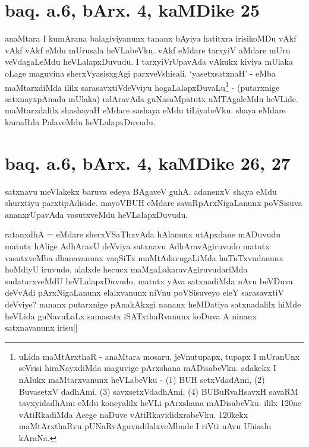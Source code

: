 \section*{baq. a.6, bArx. 4, kaMDike 25}

\stext

\begin{artha}
anaMtara I kumArana balagiviyanunx tananx bAyiya hatitxra irisikoMDu 
vAkf vAkf vAkf eMdu mUrusala heVLabeVku. vAkf eMdare tarxyiV aMdare 
mUru veVdagaLeMdu heVLalapxDuvudu. I tarxyiVrUpavAda vAkukx kiviya 
mUlaka oLage maguvina sherxVyasisxgAgi parxveVshisali. `yasetxsatxnaH' 
- eMba maMtarxdiMda ililx sarasavxtiVdeVviyu 
hogaLalapxDuvaLu\footnote[1]{uLida maMtArxthaR - anaMtara mosaru, 
jeVnutupapx, tupapx I mUranUnx seVrisi hiraNayxdiMda maguvige 
pArxshana mADisabeVku. adakekx I nAlukx maMtarxvanunx heVLabeVku - (1) 
BUH setxVdadAmi, (2) BuvasetxV dadhAmi, (3) savxsetxVdadhAmi, (4) 
BUBuRvaHsavxH savaRM tavxyidadhAmi eMdu koneyalilx heVLi pArxshana 
mADisabeVku. ililx 120ne vAtiRkadiMda Acege naDuve 
vAtiRkavididxrabeVku. 120kekx maMtArxthaRvu pUNaRvAguvudilalxveMbude I 
riVti nAvu Uhisalu kAraNa.} - (putarxnige satxnayxpAnada mUlaka) 
udAravAda guNasaMpatutx uMTAgaleMdu heVLide. maMtarxdalilx shashayaH 
eMdare sashaya eMdu tiLiyabeVku. shaya eMdare kamaRda PalaveMdu 
heVLalapxDuvudu.
\end{artha}

\section*{baq. a.6, bArx. 4, kaMDike 26, 27}

\stext

\stext

\begin{artha}
satxnavu meVlakekx baruva edeya BAgaveV guhA. adanenxV shaya eMdu 
shurxtiyu parxtipAdiside. mayoVBUH eMdare savaRpArxNigaLanunx 
poVSisuva ananxrUpavAda vasutxveMdu heVLalapxDuvudu.
\end{artha}


\begin{artha}
ratanxdhA = eMdare sherxVSaThxvAda hAlanunx utApxdane mADuvudu matutx 
hAlige AdhAravU deVviya satxnavu AdhAravAgiruvudo matutx vasutxveMba 
dhanavanunx vaqSiTx muMtAdavugaLiMda huTuTxvudanunx hoMdiyU iruvudo, 
alalxde hecucx maMgaLakaravAgiruvudariMda sudatarxveMdU 
heVLalapxDuvudo, matutx yAva satxnadiMda nAvu beVDuva deVvAdi 
pArxNigaLanunx elalxvanunx niVnu poVSisuveyo eleY sarasavxtiV deVviye? 
nananx putarxnige pAnakAkxgi nananx heMDatiya satxnadalilx hiMde 
heVLida guNavuLaLx samasatx iSATxthaRvanunx koDuva A ninanx 
satxnavanunx irisu||
\end{artha}

